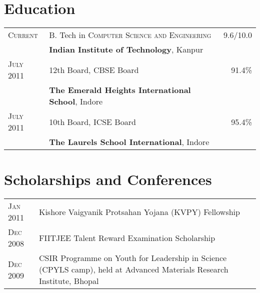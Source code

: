 \documentclass[a4paper,10pt]{article} %
\begin{document}
\section{Education}

\begin{tabular}{>{\raggedleft}p{2.2cm}p{12cm}r}

    \textsc{Current} & B. Tech in \textsc{Computer Science and Engineering} &   9.6/10.0\\
                     & \textbf{Indian Institute of Technology}, Kanpur\\

    \textsc{July 2011} & 12th Board, \textsc{CBSE} Board                    &   91.4\% \\
                       & \normalsize\textbf{The Emerald Heights International School}, Indore\\

    \textsc{July 2011} & 10th Board, \textsc{ICSE} Board                    &   95.4\% \\
                       & \normalsize\textbf{The Laurels School International}, Indore \\

\end{tabular}

\section{Scholarships and Conferences}

\begin{tabular}{>{\raggedleft}p{2.2cm}p{14cm}}

    \textsc{Jan 2011} & Kishore Vaigyanik Protsahan Yojana (KVPY) Fellowship \\
    \textsc{Dec 2008} & FIITJEE Talent Reward Examination Scholarship \\
    \textsc{Dec 2009} & CSIR Programme on Youth for Leadership in Science (CPYLS camp),
                        held at Advanced Materials Research Institute, Bhopal\\

\end{tabular}

\end{document}
